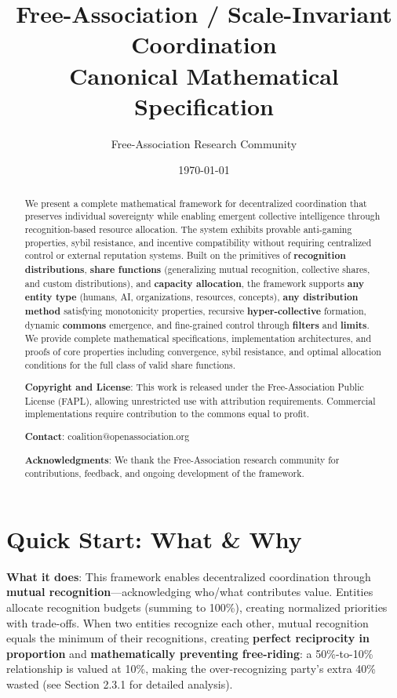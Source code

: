 \documentclass[11pt,a4paper]{article}
\title{\textbf{Free-Association / Scale-Invariant Coordination}\\
\large Canonical Mathematical Specification}
\author{Free-Association Research Community}
\date{\today}
\theoremstyle{definition}
\theoremstyle{remark}
\begin{document}
\maketitle

\begin{abstract}
We present a complete mathematical framework for decentralized coordination that preserves individual sovereignty while enabling emergent collective intelligence through recognition-based resource allocation. The system exhibits provable anti-gaming properties, sybil resistance, and incentive compatibility without requiring centralized control or external reputation systems. Built on the primitives of \textbf{recognition distributions}, \textbf{share functions} (generalizing mutual recognition, collective shares, and custom distributions), and \textbf{capacity allocation}, the framework supports \textbf{any entity type} (humans, AI, organizations, resources, concepts), \textbf{any distribution method} satisfying monotonicity properties, recursive \textbf{hyper-collective} formation, dynamic \textbf{commons} emergence, and fine-grained control through \textbf{filters} and \textbf{limits}. We provide complete mathematical specifications, implementation architectures, and proofs of core properties including convergence, sybil resistance, and optimal allocation conditions for the full class of valid share functions.

\textbf{Copyright and License}: This work is released under the Free-Association Public License (FAPL), allowing unrestricted use with attribution requirements. Commercial implementations require contribution to the commons equal to profit.

\textbf{Contact}: coalition@openassociation.org

\textbf{Acknowledgments}: We thank the Free-Association research community for contributions, feedback, and ongoing development of the framework.
\end{abstract}

\tableofcontents
\newpage

\section{Quick Start: What \& Why}

\textbf{What it does}: This framework enables decentralized coordination through \textbf{mutual recognition}---acknowledging who/what contributes value. Entities allocate recognition budgets (summing to 100\%), creating normalized priorities with trade-offs. When two entities recognize each other, mutual recognition equals the minimum of their recognitions, creating \textbf{perfect reciprocity in proportion} and \textbf{mathematically preventing free-riding}: a 50\%-to-10\% relationship is valued at 10\%, making the over-recognizing party's extra 40\% wasted (see Section 2.3.1 for detailed analysis).
\end{document}

